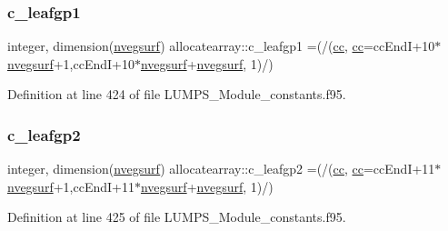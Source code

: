 \subsubsection{\texorpdfstring{c\+\_\+leafgp1}{c\_leafgp1}}
{\footnotesize\ttfamily integer, dimension(\hyperlink{namespaceallocatearray_abb987c3b35dd321963fd53d38f10236f}{nvegsurf}) allocatearray\+::c\+\_\+leafgp1 =(/(\hyperlink{namespaceallocatearray_ac863c81704eb507dee10f5e10741e10c}{cc}, \hyperlink{namespaceallocatearray_ac863c81704eb507dee10f5e10741e10c}{cc}=cc\+EndI+10$\ast$\hyperlink{namespaceallocatearray_abb987c3b35dd321963fd53d38f10236f}{nvegsurf}+1,cc\+EndI+10$\ast$\hyperlink{namespaceallocatearray_abb987c3b35dd321963fd53d38f10236f}{nvegsurf}+\hyperlink{namespaceallocatearray_abb987c3b35dd321963fd53d38f10236f}{nvegsurf}, 1)/)}



Definition at line 424 of file L\+U\+M\+P\+S\+\_\+\+Module\+\_\+constants.\+f95.

\mbox{\label{namespaceallocatearray_a4c3400e16d4412563d86fb86ca9fd369}} 
\subsubsection{\texorpdfstring{c\+\_\+leafgp2}{c\_leafgp2}}
{\footnotesize\ttfamily integer, dimension(\hyperlink{namespaceallocatearray_abb987c3b35dd321963fd53d38f10236f}{nvegsurf}) allocatearray\+::c\+\_\+leafgp2 =(/(\hyperlink{namespaceallocatearray_ac863c81704eb507dee10f5e10741e10c}{cc}, \hyperlink{namespaceallocatearray_ac863c81704eb507dee10f5e10741e10c}{cc}=cc\+EndI+11$\ast$\hyperlink{namespaceallocatearray_abb987c3b35dd321963fd53d38f10236f}{nvegsurf}+1,cc\+EndI+11$\ast$\hyperlink{namespaceallocatearray_abb987c3b35dd321963fd53d38f10236f}{nvegsurf}+\hyperlink{namespaceallocatearray_abb987c3b35dd321963fd53d38f10236f}{nvegsurf}, 1)/)}



Definition at line 425 of file L\+U\+M\+P\+S\+\_\+\+Module\+\_\+constants.\+f95.

\mbox{\label{namespaceallocatearray_aebfaf59540cf6f07c6a4e31ba8300bda}} 
